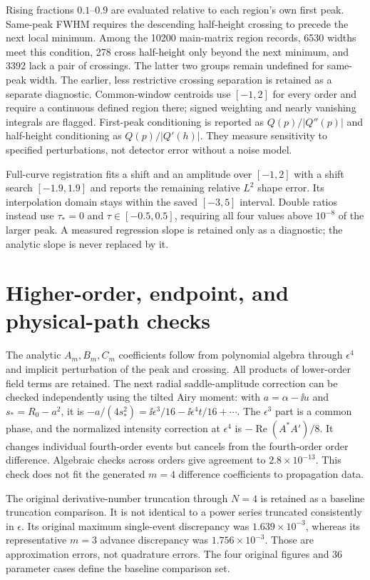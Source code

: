 Rising fractions $0.1$--$0.9$ are evaluated relative to each region's
own first peak. Same-peak FWHM requires the descending half-height
crossing to precede the next local minimum. Among the 10200 main-matrix
region records, 6530 widths meet this condition, 278 cross half-height
only beyond the next minimum, and 3392 lack a pair of crossings.
The latter two groups remain undefined for same-peak width. The earlier,
less restrictive crossing separation is retained as a separate diagnostic.
Common-window centroids use $[-1,2]$ for every order and require a
continuous defined region there; signed weighting and nearly vanishing
integrals are flagged. First-peak conditioning is reported as
$Q(p)/|Q''(p)|$ and half-height conditioning as $Q(p)/|Q'(h)|$.
They measure sensitivity to specified perturbations, not detector error
without a noise model.

Full-curve registration fits a shift and an amplitude over $[-1,2]$
with a shift search $[-1.9,1.9]$ and reports the remaining relative
$L^2$ shape error. Its interpolation domain stays within the saved
$[-3,5]$ interval. Double ratios instead use $\tau_*=0$ and
$\tau\in[-0.5,0.5]$, requiring all four values above
$10^{-8}$ of the larger peak. A measured regression slope is retained
only as a diagnostic; the analytic slope is never replaced by it.

\section{Higher-order, endpoint, and physical-path checks}
\label{sec:si-residuals}
The analytic $A_m,B_m,C_m$ coefficients follow from polynomial algebra
through $\epsilon^4$ and implicit perturbation of the peak and crossing.
All products of lower-order field terms are retained. The next radial
saddle-amplitude correction can be checked independently using the tilted
Airy moment: with $a=\alpha-\ii u$ and $s_*=R_0-a^2$, it is
$-a/(4s_*^2)=\ii\epsilon^3/16-\ii\epsilon^4t/16+\cdots$.
The $\epsilon^3$ part is a common phase, and the normalized intensity
correction at $\epsilon^4$ is $-\operatorname{Re}(A^*A')/8$.
It changes individual fourth-order events but cancels from the
fourth-order order difference. Algebraic checks across orders give
agreement to $2.8\times10^{-13}$. This check does not fit the generated
$m=4$ difference coefficients to propagation data.

The original derivative-number truncation through $N=4$ is retained as
a baseline truncation comparison. It is not identical to a power series truncated
consistently in $\epsilon$. Its original maximum single-event discrepancy
was $1.639\times10^{-3}$, whereas its representative $m=3$ advance
discrepancy was $1.756\times10^{-3}$. Those are approximation errors,
not quadrature errors. The four original figures and 36 parameter cases
define the baseline comparison set.

